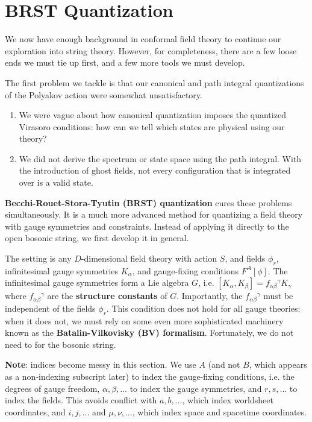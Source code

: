 \documentclass{report}
\theoremstyle{plain}
\theoremstyle{definition}
\theoremstyle{remark}
\begin{document}
\chapter{BRST Quantization}

We now have enough background in conformal field theory to continue
our exploration into string theory. However, for completeness, there
are a few loose ends we must tie up first, and a few more tools we
must develop.

The first problem we tackle is that our canonical and path integral
quantizations of the Polyakov action were somewhat unsatisfactory.
\begin{enumerate}
\item We were vague about how canonical quantization imposes the
  quantized Virasoro conditions: how can we tell which states are
  physical using our theory?
\item We did not derive the spectrum or state space using the path
  integral. With the introduction of ghost fields, not every
  configuration that is integrated over is a valid state.
\end{enumerate}
{\bf Becchi-Rouet-Stora-Tyutin (BRST) quantization} cures these
problems simultaneously. It is a much more advanced method for
quantizing a field theory with gauge symmetries and constraints.
Instead of applying it directly to the open bosonic string, we first
develop it in general.

The setting is any $D$-dimensional field theory with action $S$, and
fields $\phi_r$, infinitesimal gauge symmetries $K_\alpha$, and
gauge-fixing conditions $F^A[\phi]$. The infinitesimal gauge
symmetries form a Lie algebra $G$, i.e. $[K_\alpha, K_\beta] =
f_{\alpha\beta}{}^\gamma K_\gamma$ where $f_{\alpha\beta}{}^\gamma$
are the {\bf structure constants} of $G$. Importantly, the
$f_{\alpha\beta}{}^\gamma$ must be independent of the fields $\phi_r$.
This condition does not hold for all gauge theories: when it does not,
we must rely on some even more sophisticated machinery known as the
{\bf Batalin-Vilkovisky (BV) formalism}. Fortunately, we do not need
to for the bosonic string.

{\bf Note}: indices become messy in this section. We use $A$ (and not
$B$, which appears as a non-indexing subscript later) to index the
gauge-fixing conditions, i.e. the degrees of gauge freedom, $\alpha,
\beta, \ldots$ to index the gauge symmetries, and $r, s, \ldots$ to
index the fields. This avoids conflict with $a, b, \ldots$, which
index worldsheet coordinates, and $i, j, \ldots$ and $\mu, \nu,
\ldots$, which index space and spacetime coordinates.
\end{document}

